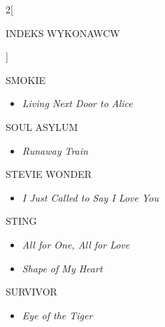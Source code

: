 \documentclass[a4paper]{report}
\begin{document}
\begin{multicols*}{2}[\begin{Huge}INDEKS WYKONAWCW\end{Huge}\vspace{1cm}]
\begin{minipage}{\columnwidth}
\begin{itemize}[topsep=3pt, after=\vspace{3mm}]
	\end{itemize}
\end{minipage}
\begin{minipage}{\columnwidth}
	SMOKIE 
	\begin{itemize}[topsep=3pt, after=\vspace{3mm}]
		\itemsep0em
		\item[]\textit{Living Next Door to Alice}  \\
	\end{itemize}
\end{minipage}
\begin{minipage}{\columnwidth}
	SOUL ASYLUM 
	\begin{itemize}[topsep=3pt, after=\vspace{3mm}]
		\itemsep0em
		\item[]\textit{Runaway Train}  \\
	\end{itemize}
\end{minipage}
\begin{minipage}{\columnwidth}
	STEVIE WONDER 
	\begin{itemize}[topsep=3pt, after=\vspace{3mm}]
		\itemsep0em
		\item[]\textit{I Just Called to Say I Love You}  \\
	\end{itemize}
\end{minipage}
\begin{minipage}{\columnwidth}
	STING 
	\begin{itemize}[topsep=3pt, after=\vspace{3mm}]
		\itemsep0em
		\item[]\textit{All for One, All for Love}  \\
		\item[]  \textit{Shape of My Heart}  \\
	\end{itemize}
\end{minipage}
\begin{minipage}{\columnwidth}
	SURVIVOR 
	\begin{itemize}[topsep=3pt, after=\vspace{3mm}]
		\itemsep0em
		\item[]\textit{Eye of the Tiger}  \\
	\end{itemize}
\end{minipage}

\end{multicols*}
\end{document}

